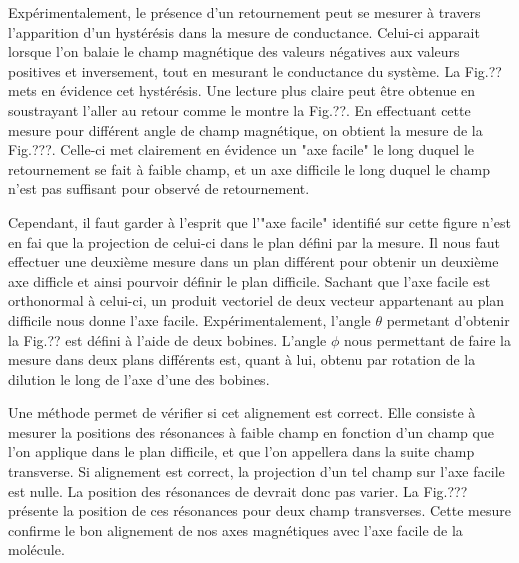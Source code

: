 Expérimentalement, le présence d'un retournement peut se mesurer à travers l'apparition d'un hystérésis dans la mesure de conductance. Celui-ci apparait lorsque l'on balaie le champ magnétique des valeurs négatives aux valeurs positives et inversement, tout en mesurant le conductance du système. La Fig.?? mets en évidence cet hystérésis. Une lecture plus claire peut être obtenue en soustrayant l'aller au retour comme le montre la Fig.??. En effectuant cette mesure pour différent angle de champ magnétique, on obtient la mesure de la Fig.???. Celle-ci met clairement en évidence un "axe facile" le long duquel le retournement se fait à faible champ, et un axe difficile le long duquel le champ n'est pas suffisant pour observé de retournement.

Cependant, il faut garder à l'esprit que l'"axe facile" identifié sur cette figure n'est en fai que la projection de celui-ci dans le plan défini par la mesure. Il nous faut effectuer une deuxième mesure dans un plan différent pour obtenir un deuxième axe difficle et ainsi pourvoir définir le plan difficile. Sachant que l'axe facile est orthonormal à celui-ci, un produit vectoriel de deux vecteur appartenant au plan difficile nous donne l'axe facile. Expérimentalement, l'angle $\theta$ permetant d'obtenir la Fig.?? est défini à l'aide de deux bobines. L'angle $\phi$ nous permettant de faire la mesure dans deux plans différents est, quant à lui, obtenu par rotation de la dilution le long de l'axe d'une des bobines.


Une méthode permet de vérifier si cet alignement est correct.  Elle consiste à mesurer la positions des résonances à faible champ en fonction d'un champ que l'on applique dans le plan difficile, et que l'on appellera dans la suite champ transverse. Si alignement est correct, la projection d'un tel champ sur l'axe facile est nulle. La position des résonances de devrait donc pas varier. La Fig.??? présente la position de ces résonances pour deux champ transverses. Cette mesure confirme le bon alignement de nos axes magnétiques avec l'axe facile de la molécule.
